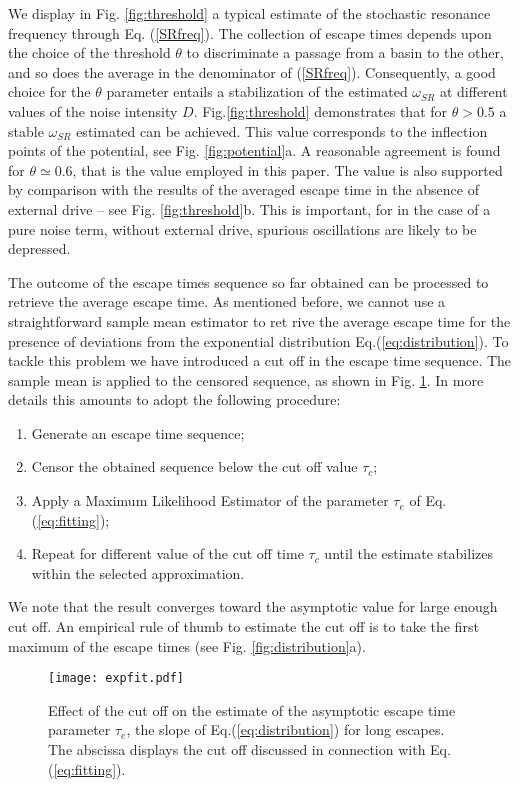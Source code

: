 \documentclass[conference]{IEEEtran}
\begin{document}
We display in Fig. \ref{fig:threshold} a typical estimate of the stochastic resonance frequency through Eq. (\ref{SRfreq}). The collection of escape times depends upon the choice of the threshold $\theta$ to discriminate a passage from a basin to the other, and so does the average in the denominator of (\ref{SRfreq}). Consequently,  a good choice for the $\theta $ parameter entails a stabilization of the estimated $\omega_{SR}$ at different values of the noise intensity $D$.
Fig.\ref{fig:threshold} demonstrates that for $\theta >0.5$ a stable $\omega_{SR}$
estimated can be achieved. This value corresponds to the inflection points of the potential, see Fig. \ref{fig:potential}a. 
A reasonable agreement is found for $\theta \simeq 0.6$, that is the value employed in this paper. The value is also supported by comparison with the results of the averaged escape time in the absence of external drive -- see Fig. \ref{fig:threshold}b. This is important, for in the case of a pure noise term, without external drive, spurious oscillations are likely to be depressed.


The outcome of the escape times sequence so far obtained can be processed to retrieve the average escape time. As mentioned before, we cannot use a straightforward sample mean estimator to ret rive the average escape time for the presence of deviations from the exponential distribution Eq.(\ref{eq:distribution}). 
To tackle this problem we have introduced a cut off in the escape time sequence. The sample mean is applied to the censored sequence, as shown in Fig. \ref{fig:cut}. 
In more details this amounts to adopt the following procedure:
\begin{enumerate}
\item Generate an escape time sequence;
\item Censor the obtained sequence below the cut off value $\tau_c$;
\item Apply a Maximum Likelihood Estimator of the parameter $\tau_e$ of Eq.(\ref{eq:fitting});
\item Repeat for different value of the cut off time $\tau_c$ until the estimate stabilizes within the selected approximation.
\end{enumerate}


We note that the result converges toward the asymptotic value for large enough cut off. An empirical rule of thumb to estimate the cut off is to take the first maximum of the escape times (see Fig. \ref{fig:distribution}a).


\begin{figure}
\centerline{\texttt{[image: expfit.pdf]}}
\caption{
Effect of the cut off on the estimate of the asymptotic escape time parameter $\tau_e$, the slope of Eq.(\ref{eq:distribution}) for long escapes.
The abscissa displays the cut off discussed in connection with Eq.(\ref{eq:fitting}).
}
\label{fig:cut}
\end{figure}
\end{document}
